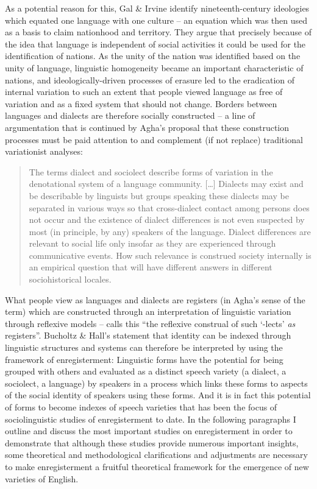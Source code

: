 As a potential reason for this, Gal \& Irvine identify nineteenth-century ideologies which equated one language with one culture – an equation which was then used as a basis to claim nationhood and territory. They argue that precisely because of the idea that language is independent of social activities it could be used for the identification of nations. As the unity of the nation was identified based on the unity of language, linguistic homogeneity became an important characteristic of nations, and ideologically-driven processes of erasure led to the eradication of internal variation to such an extent that people viewed language as free of variation and as a fixed system that should not change. Borders between languages and dialects are therefore socially constructed – a line of argumentation that is continued by Agha’s proposal that these construction processes must be paid attention to and complement (if not replace) traditional variationist analyses:


\begin{quote}
The terms dialect and sociolect describe forms of variation in the denotational system of a language community. […] Dialects may exist and be describable by linguists but groups speaking these dialects may be separated in various ways so that cross-dialect contact among persons does not occur and the existence of dialect differences is not even suspected by most (in principle, by any) speakers of the language. Dialect differences are relevant to social life only insofar as they are experienced through communicative events. How such relevance is construed society internally is an empirical question that will have different answers in different sociohistorical locales. \citep[132]{Agha2007}
\end{quote}


What people view as languages and dialects are registers (in Agha’s sense of the term) which are constructed through an interpretation of linguistic variation through reflexive models – \citet[135]{Agha2007} calls this “the reflexive construal of such ‘-lects’ \emph{as} registers”. Bucholtz \& Hall’s statement that identity can be indexed through linguistic structures and systems can therefore be interpreted by using the framework of enregisterment: Linguistic forms have the potential for being grouped with others and evaluated as a distinct speech variety (a dialect, a sociolect, a language) by speakers in a process which links these forms to aspects of the social identity of speakers using these forms. And it is in fact this potential of forms to become indexes of speech varieties that has been the focus of sociolinguistic studies of enregisterment to date. In the following paragraphs I outline and discuss the most important studies on enregisterment in order to demonstrate that although these studies provide numerous important insights, some theoretical and methodological clarifications and adjustments are necessary to make enregisterment a fruitful theoretical framework for the emergence of new varieties of English.


